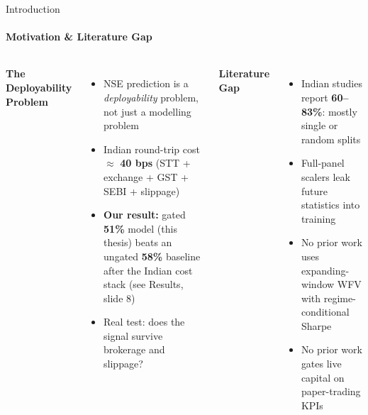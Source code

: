 \documentclass[10pt,aspectratio=43]{beamer}
\newcommand{\rd}[1]{\textcolor{tertiary}{\textbf{#1}}}
\newcommand{\gd}[1]{\textcolor{secondary}{\textbf{#1}}}
\newcommand{\vsep}{\vspace{0.04cm}}
\begin{document}
\begin{frame}{Introduction}
  \framesubtitle{Motivation \& Literature Gap}
  \begin{columns}[T]
      \gd{\textbf{The Deployability Problem}}
      \vsep
      \begin{itemize}\itemsep4pt
        \item NSE prediction is a \emph{deployability} problem, not just a modelling problem
        \item Indian round-trip cost $\approx$ \textbf{40 bps} (STT + exchange + GST + SEBI + slippage)
        \item \textbf{Our result:} gated \textbf{51\%} model (this thesis) beats an ungated \textbf{58\%} baseline after the Indian cost stack \hfill {\scriptsize(see Results, slide 8)}
        \item Real test: does the signal survive brokerage and slippage?
      \end{itemize}
      \gd{\textbf{Literature Gap}}
      \vsep
      \begin{itemize}\itemsep4pt
        \item Indian studies report \rd{60--83\%}: mostly single or random splits
        \item Full-panel scalers leak future statistics into training
        \item No prior work uses expanding-window WFV with regime-conditional Sharpe
        \item No prior work gates live capital on paper-trading KPIs
      \end{itemize}
  \end{columns}
\end{frame}
\end{document}
